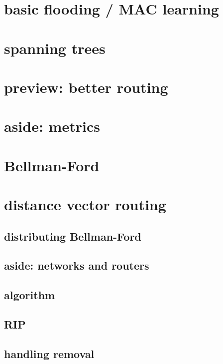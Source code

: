 \section{basic flooding / MAC learning}


\section{spanning trees}


\section{preview: better routing}


\section{aside: metrics}


\section{Bellman-Ford}


\section{distance vector routing}
\subsection{distributing Bellman-Ford}


\subsection{aside: networks and routers}
 

\subsection{algorithm}


\subsection{RIP}



\subsection{handling removal}

